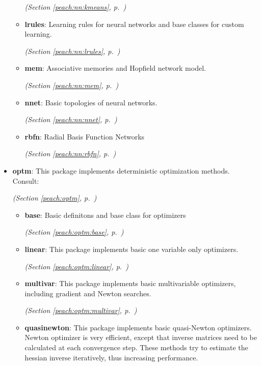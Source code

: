 \begin{itemize}
\begin{itemize}
  \textit{(Section \ref{peach:nn:kmeans}, p.~\pageref{peach:nn:kmeans})}

    \item \textbf{lrules}: 
Learning rules for neural networks and base classes for custom learning.


  \textit{(Section \ref{peach:nn:lrules}, p.~\pageref{peach:nn:lrules})}

    \item \textbf{mem}: 
Associative memories and Hopfield network model.


  \textit{(Section \ref{peach:nn:mem}, p.~\pageref{peach:nn:mem})}

    \item \textbf{nnet}: 
Basic topologies of neural networks.


  \textit{(Section \ref{peach:nn:nnet}, p.~\pageref{peach:nn:nnet})}

    \item \textbf{rbfn}: 
Radial Basis Function Networks


  \textit{(Section \ref{peach:nn:rbfn}, p.~\pageref{peach:nn:rbfn})}

  \end{itemize}
\item \textbf{optm}: 
This package implements deterministic optimization methods. Consult:


  \textit{(Section \ref{peach:optm}, p.~\pageref{peach:optm})}

  \begin{itemize}
\setlength{\parskip}{0ex}
    \item \textbf{base}: 
Basic definitons and base class for optimizers


  \textit{(Section \ref{peach:optm:base}, p.~\pageref{peach:optm:base})}

    \item \textbf{linear}: 
This package implements basic one variable only optimizers.


  \textit{(Section \ref{peach:optm:linear}, p.~\pageref{peach:optm:linear})}

    \item \textbf{multivar}: 
This package implements basic multivariable optimizers, including gradient and
Newton searches.


  \textit{(Section \ref{peach:optm:multivar}, p.~\pageref{peach:optm:multivar})}

    \item \textbf{quasinewton}: 
This package implements basic quasi-Newton optimizers. Newton optimizer is very
efficient, except that inverse matrices need to be calculated at each
convergence step. These methods try to estimate the hessian inverse iteratively,
thus increasing performance.



\end{itemize}
\end{itemize}
